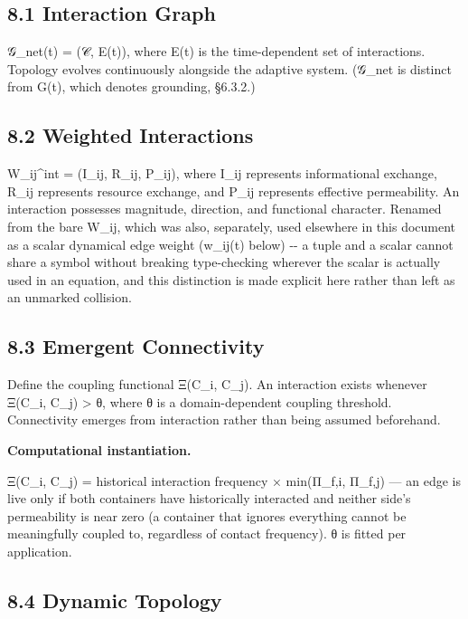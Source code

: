 \documentclass[
]{article}
\begin{document}
\hypertarget{interaction-graph}{%
\subsection{8.1 Interaction Graph}\label{interaction-graph}}

𝒢\_net(t) = (𝒞, E(t)), where E(t) is the time-dependent set of
interactions. Topology evolves continuously alongside the adaptive
system. (𝒢\_net is distinct from G(t), which denotes grounding, §6.3.2.)

\hypertarget{weighted-interactions}{%
\subsection{8.2 Weighted Interactions}\label{weighted-interactions}}

W\_ij\^{}int = (I\_ij, R\_ij, P\_ij), where I\_ij represents
informational exchange, R\_ij represents resource exchange, and P\_ij
represents effective permeability. An interaction possesses magnitude,
direction, and functional character. Renamed from the bare W\_ij, which
was also, separately, used elsewhere in this document as a scalar
dynamical edge weight (w\_ij(t) below) -\/- a tuple and a scalar cannot
share a symbol without breaking type-checking wherever the scalar is
actually used in an equation, and this distinction is made explicit here
rather than left as an unmarked collision.

\hypertarget{emergent-connectivity}{%
\subsection{8.3 Emergent Connectivity}\label{emergent-connectivity}}

Define the coupling functional Ξ(C\_i, C\_j). An interaction exists
whenever Ξ(C\_i, C\_j) \textgreater{} θ, where θ is a domain-dependent
coupling threshold. Connectivity emerges from interaction rather than
being assumed beforehand.

\textbf{Computational instantiation.}

Ξ(C\_i, C\_j) = historical interaction frequency × min(Π\_f,i, Π\_f,j)
--- an edge is live only if both containers have historically interacted
and neither side's permeability is near zero (a container that ignores
everything cannot be meaningfully coupled to, regardless of contact
frequency). θ is fitted per application.

\hypertarget{dynamic-topology}{%
\subsection{8.4 Dynamic Topology}\label{dynamic-topology}}
\end{document}

